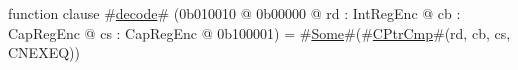 function clause #\hyperref[sailMIPSzdecode]{decode}# (0b010010 @ 0b00000 @ rd : IntRegEnc @ cb : CapRegEnc @ cs : CapRegEnc @ 0b100001) = #\hyperref[sailMIPSzSome]{Some}#(#\hyperref[sailMIPSzCPtrCmp]{CPtrCmp}#(rd, cb, cs, CNEXEQ))
